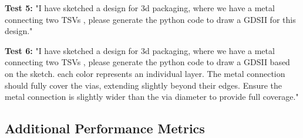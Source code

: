 \documentclass{article}
\begin{document}
\textbf{Test 5:} "I have sketched a design for 3d packaging, where we have a metal connecting two TSVs , please generate the python code to draw a GDSII for this design."

\textbf{Test 6:} "I have sketched a design for 3d packaging, where we have a metal connecting two TSVs , please generate the python code to draw a GDSII based on the sketch. each color represents an individual layer. The metal connection should fully cover the vias, extending slightly beyond their edges. Ensure the metal connection is slightly wider than the via diameter to provide full coverage."


\subsection{Additional Performance Metrics}
\label{appendix:performance_metrics}

\end{document}
